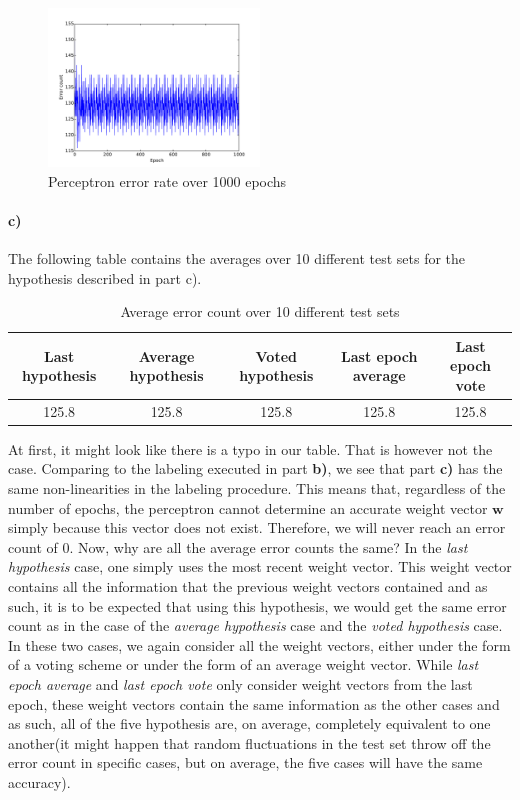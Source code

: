 \documentclass{article}
\begin{document}
\begin{figure}[ht]
\centering\includegraphics[width=0.5\textwidth]{prcp.pdf}
\caption{Perceptron error rate over 1000 epochs}\label{fig:prcp}
\hfill
\end{figure}

\paragraph{c)}
The following table contains the averages over 10 different test sets for the hypothesis described in part c).

\begin{table}[ht]
    \begin{center}
    \begin{tabular}{c|c|c|c|c}

		Last hypothesis & Average hypothesis & Voted hypothesis & Last epoch average & Last epoch vote \\
	   \hline		125.8 & 125.8 & 125.8 & 125.8 & 125.8
        \end{tabular}\caption{Average error count over 10 different test sets}
    \end{center}
\end{table}

At first, it might look like there is a typo in our table. That is however not the case. Comparing to the labeling executed in part \textbf{b)}, we see that part \textbf{c)} has the same non-linearities in the labeling procedure. This means that, regardless of the number of epochs, the perceptron cannot determine an accurate weight vector $\mathbf{w}$ simply because this vector does not exist. Therefore, we will never reach an error count of 0. Now, why are all the average error counts the same?
In the \textit{last hypothesis} case, one simply uses the most recent weight vector. This weight vector contains all the information that the previous weight vectors contained and as such, it is to be expected that using this hypothesis, we would get the same error count as in the case of the \textit{average hypothesis} case and the \textit{voted hypothesis} case. In these two cases, we again consider all the weight vectors, either under the form of a voting scheme or under the form of an average weight vector. While \textit{last epoch average} and \textit{last epoch vote} only consider weight vectors from the last epoch, these weight vectors contain the same information as the other cases and as such, all of the five hypothesis are, on average, completely equivalent to one another(it might happen that random fluctuations in the test set throw off the error count in specific cases, but on average, the five cases will have the same accuracy).
\end{document}
